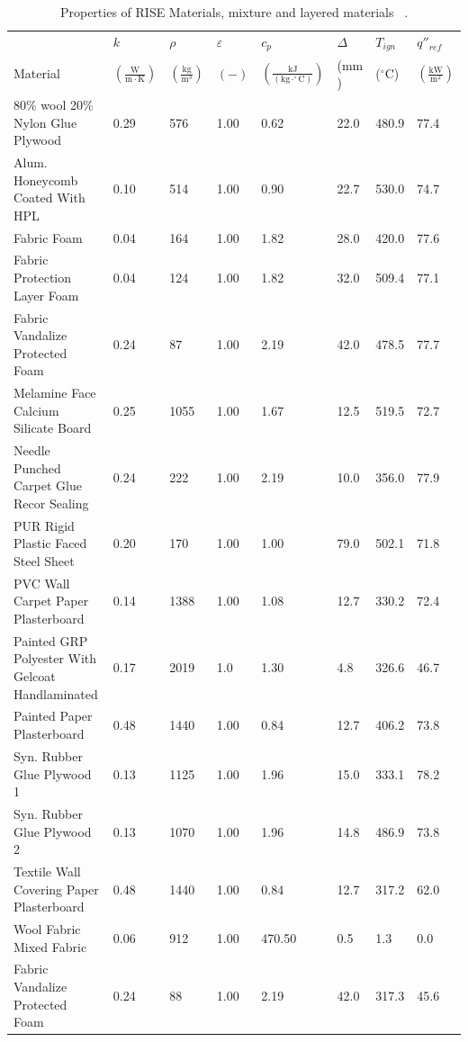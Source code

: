 \begin{table}[!h]
\caption[Properties of RISE Materials, mixture and layered materials]{Properties of RISE Materials, mixture and layered materials ~\cite{RISE:Fire_Database}.}
\centering
\begin{tabular}{|p{2.6cm}|p{1.8cm}|p{1.3cm}|p{0.9cm}|p{1.7cm}|p{1.0cm}|p{1.0cm}|p{1.6cm}|}
\hline
                                               & $k$    & $\rho$      & $\varepsilon$   & $c_{p}$ & $\Delta$    & $T_{ign}$ & $q''_{ref}$ \\
Material                                       & $\mathrm{\left(\frac{W}{m\cdot K}\right)}$ & $\mathrm{\left(\frac{kg}{m^{3}}\right)}$ & $\mathrm{( - )}$ & $\mathrm{\left(\frac{kJ}{(kg\cdot ^{\circ}C)}\right)}$ &  ($\mathrm{mm}$)   & ($\mathrm{^{\circ}C}$) & $\mathrm{\left(\frac{kW}{m^{2}}\right)}$ \\ \hline
\hline
80\% wool 20\% Nylon Glue Plywood & 0.29 & 576 & 1.00 & 0.62 & 22.0 & 480.9 & 77.4 \\ \hline
Alum. Honeycomb Coated With HPL & 0.10 & 514 & 1.00 & 0.90 & 22.7 & 530.0 & 74.7 \\ \hline
Fabric Foam & 0.04 & 164 & 1.00 & 1.82 & 28.0 & 420.0 & 77.6 \\ \hline
Fabric Protection Layer Foam & 0.04 & 124 & 1.00 & 1.82 & 32.0 & 509.4 & 77.1 \\ \hline
Fabric Vandalize Protected Foam & 0.24 & 87 & 1.00 & 2.19 & 42.0 & 478.5 & 77.7 \\ \hline
Melamine Face Calcium Silicate Board & 0.25 & 1055 & 1.00 & 1.67 & 12.5 & 519.5 & 72.7 \\ \hline
Needle Punched Carpet Glue Recor Sealing & 0.24 & 222 & 1.00 & 2.19 & 10.0 & 356.0 & 77.9 \\ \hline
PUR Rigid Plastic Faced Steel Sheet & 0.20 & 170 & 1.00 & 1.00 & 79.0 & 502.1 & 71.8 \\ \hline
PVC Wall Carpet Paper Plasterboard & 0.14 & 1388 & 1.00 & 1.08 & 12.7 & 330.2 & 72.4 \\ \hline
Painted GRP Polyester With Gelcoat Handlaminated & 0.17 & 2019 & 1.0 & 1.30 & 4.8 & 326.6 & 46.7 \\ \hline
Painted Paper Plasterboard & 0.48 & 1440 & 1.00 & 0.84 & 12.7 & 406.2 & 73.8 \\ \hline
Syn. Rubber Glue Plywood 1 & 0.13 & 1125 & 1.00 & 1.96 & 15.0 & 333.1 & 78.2 \\ \hline
Syn. Rubber Glue Plywood 2 & 0.13 & 1070 & 1.00 & 1.96 & 14.8 & 486.9 & 73.8 \\ \hline
Textile Wall Covering Paper Plasterboard & 0.48 & 1440 & 1.00 & 0.84 & 12.7 & 317.2 & 62.0 \\ \hline
Wool Fabric Mixed Fabric & 0.06 & 912 & 1.00 & 470.50 & 0.5 & 1.3 & 0.0 \\ \hline
Fabric Vandalize Protected Foam & 0.24 & 88 & 1.00 & 2.19 & 42.0 & 317.3 & 45.6 \\ \hline
\end{tabular}
\label{Properties_RISE_Materials_mixtures}
\end{table}

